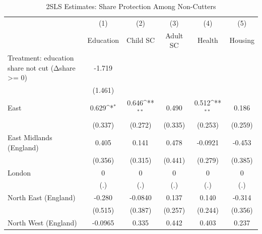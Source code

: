 \begin{table}[htbp]\centering
\def\sym#1{\ifmmode^{#1}\else\(^{#1}\)\fi}
\caption{2SLS Estimates: Share Protection Among Non-Cutters}
\begin{tabular}{l*{5}{c}}
\toprule
                    &\multicolumn{1}{c}{(1)}&\multicolumn{1}{c}{(2)}&\multicolumn{1}{c}{(3)}&\multicolumn{1}{c}{(4)}&\multicolumn{1}{c}{(5)}\\
                    &\multicolumn{1}{c}{Education}&\multicolumn{1}{c}{Child SC}&\multicolumn{1}{c}{Adult SC}&\multicolumn{1}{c}{Health}&\multicolumn{1}{c}{Housing}\\
\midrule
Treatment: education share not cut (Δshare >= 0)&      -1.719         &                     &                     &                     &                     \\
                    &     (1.461)         &                     &                     &                     &                     \\
\addlinespace
East                &       0.629\sym{*}  &       0.646\sym{**} &       0.490         &       0.512\sym{**} &       0.186         \\
                    &     (0.337)         &     (0.272)         &     (0.335)         &     (0.253)         &     (0.259)         \\
\addlinespace
East Midlands (England)&       0.405         &       0.141         &       0.478         &     -0.0921         &      -0.453         \\
                    &     (0.356)         &     (0.315)         &     (0.441)         &     (0.279)         &     (0.385)         \\
\addlinespace
London              &           0         &           0         &           0         &           0         &           0         \\
                    &         (.)         &         (.)         &         (.)         &         (.)         &         (.)         \\
\addlinespace
North East (England)&      -0.280         &     -0.0840         &       0.137         &       0.140         &      -0.314         \\
                    &     (0.515)         &     (0.387)         &     (0.257)         &     (0.244)         &     (0.356)         \\
\addlinespace
North West (England)&     -0.0965         &       0.335         &       0.442         &       0.403         &       0.237         \\

\end{tabular}
\end{table}
